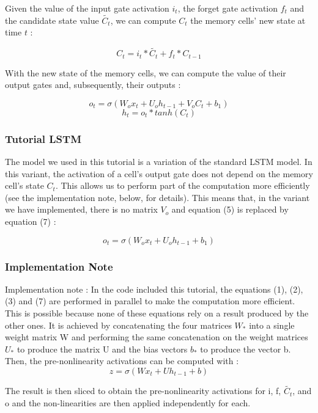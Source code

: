 \documentclass[utf8x,xcolor=pdftex,dvipsnames,table]{beamer}
\begin{document}
\begin{frame}[allowframebreaks]
\framebreak

Given the value of the input gate activation $i_t$, the forget gate activation $f_t$ and the candidate state value $\widetilde{C_t}$, we can compute $C_t$ the memory cells’ new state at time $t$ :

\begin{equation}
C_t = i_t * \widetilde{C_t} + f_t * C_{t-1}
\end{equation}

With the new state of the memory cells, we can compute the value of their output gates and, subsequently, their outputs :

\begin{equation}
o_t = \sigma(W_o x_t + U_o h_{t-1} + V_o C_t + b_1)
\end{equation}
\begin{equation}
h_t = o_t * tanh(C_t)
\end{equation}

\end{frame}

\begin{frame}
  \frametitle{Tutorial LSTM}
The model we used in this tutorial is a variation of the standard LSTM model. In this variant, the activation of a cell’s output gate does not depend on the memory cell’s state $C_t$. This allows us to perform part of the computation more efficiently (see the implementation note, below, for details). This means that, in the variant we have implemented, there is no matrix $V_o$ and equation (5) is replaced by equation (7) :

\begin{equation}
o_t = \sigma(W_o x_t + U_o h_{t-1} + b_1)
\end{equation}

\end{frame}

\begin{frame}
  \frametitle{Implementation Note}
Implementation note : In the code included this tutorial, the equations (1), (2), (3) and (7) are performed in parallel to make the computation more efficient. This is possible because none of these equations rely on a result produced by the other ones. It is achieved by concatenating the four matrices $W_*$ into a single weight matrix W and performing the same concatenation on the weight matrices $U_*$ to produce the matrix U and the bias vectors $b_*$ to produce the vector b. Then, the pre-nonlinearity activations can be computed with :
\vspace{-1em}
\begin{equation*}
z = \sigma(W x_t + U h_{t-1} + b)
\end{equation*}
\vspace{-2em} %

The result is then sliced to obtain the pre-nonlinearity activations for i, f, $\widetilde{C_t}$, and o and the non-linearities are then applied independently for each.
\end{frame}
\end{document}
